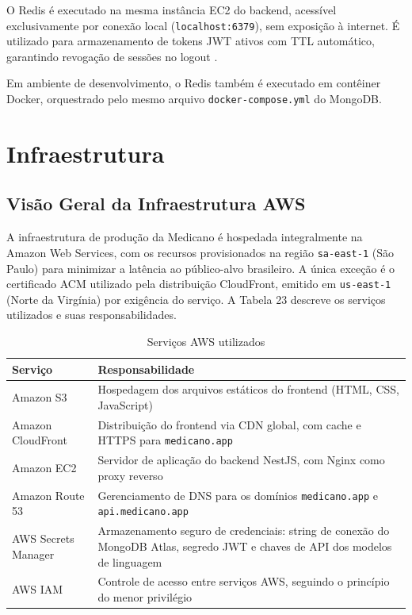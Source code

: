 O Redis é executado na mesma instância EC2 do
backend, acessível exclusivamente por conexão
local (\texttt{localhost:6379}), sem exposição
à internet. É utilizado para armazenamento de
tokens JWT ativos com TTL automático, garantindo
revogação de sessões no logout \cite{redis2024}.

Em ambiente de desenvolvimento, o Redis também
é executado em contêiner Docker, orquestrado
pelo mesmo arquivo \texttt{docker-compose.yml}
do MongoDB.

\section{Infraestrutura}
\label{sec:infrastructure}

\subsection{Visão Geral da Infraestrutura AWS}
\label{subsec:aws-overview}

A infraestrutura de produção da Medicano é hospedada
integralmente na Amazon Web Services, com os recursos
provisionados na região \texttt{sa-east-1} (São Paulo)
para minimizar a latência ao público-alvo brasileiro.
A única exceção é o certificado ACM utilizado pela
distribuição CloudFront, emitido em \texttt{us-east-1}
(Norte da Virgínia) por exigência do serviço.
A Tabela 23 descreve os serviços utilizados e suas
responsabilidades.

\begin{table}[H]
  \centering
  \caption{Serviços AWS utilizados}
  \label{tab:aws-services}
  \begin{tabular}{p{3.5cm}p{7.5cm}}
    \toprule
    \textbf{Serviço} &
    \textbf{Responsabilidade} \\
    \midrule
    Amazon S3
      & Hospedagem dos arquivos estáticos do
        frontend (HTML, CSS, JavaScript) \\
    Amazon CloudFront
      & Distribuição do frontend via CDN global,
        com cache e HTTPS para \texttt{medicano.app} \\
    Amazon EC2
      & Servidor de aplicação do backend NestJS,
        com Nginx como proxy reverso \\
    Amazon Route 53
      & Gerenciamento de DNS para os domínios
        \texttt{medicano.app} e
        \texttt{api.medicano.app} \\
    AWS Secrets Manager
      & Armazenamento seguro de credenciais:
        string de conexão do MongoDB Atlas,
        segredo JWT e chaves de API dos
        modelos de linguagem \\
    AWS IAM
      & Controle de acesso entre serviços AWS,
        seguindo o princípio do menor privilégio \\
    \bottomrule
  \end{tabular}
\end{table}

